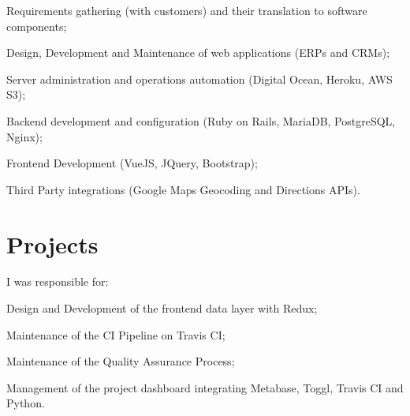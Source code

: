 \documentclass[]{deedy-resume-openfont}
\begin{document}
\begin{minipage}[t]{0.65\textwidth}
\begin{tightemize}
\item Requirements gathering (with customers) and their translation to software components;
\item Design, Development and Maintenance of web applications (ERPs and CRMs);
\item Server administration and operations automation (Digital Ocean, Heroku, AWS S3);
\item Backend development and configuration (Ruby on Rails, MariaDB, PostgreSQL, Nginx);
\item Frontend Development (VueJS, JQuery, Bootstrap);
\item Third Party integrations (Google Maps Geocoding and Directions APIs).
\end{tightemize}
\sectionsep


\section{Projects}
\vspace{\topsep} %
I was responsible for:
\begin{tightemize}
	\item Design and Development of the frontend data layer with Redux;
	\item Maintenance of the CI Pipeline on Travis CI;
	\item Maintenance of the Quality Assurance Process;
	\item Management of the project dashboard integrating Metabase, Toggl, Travis CI and Python.
\end{tightemize}
\sectionsep
\begin{comment}

\end{comment}
\end{minipage}
\end{document}
